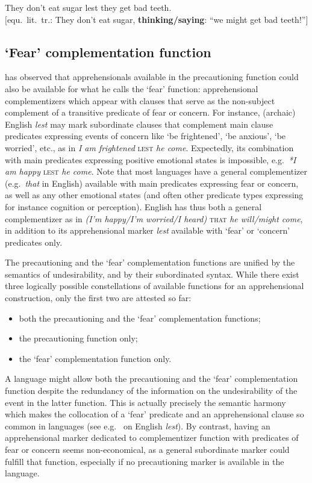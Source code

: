 \documentclass[output=paper,colorlinks,citecolor=brown]{langscibook}
\begin{document}
\ea \label{p57} They don't eat sugar lest they get bad teeth. \\
\textnormal{$[$equ.\ lit.\ tr.: They don't eat sugar, \textbf{thinking/saying}: ``we might get bad teeth!''$]$}
\z


\subsection{`Fear' complementation function}
\label{subsec:prefear}

\citet{lichtenberk1995} has observed that apprehensionals available in the precautioning function could also be available for what he calls the `fear' function: apprehensional complementizers which appear with clauses that serve as the non-subject complement of a transitive predicate of fear or concern. For instance, (archaic) English \textit{lest} may mark subordinate clauses that complement main clause predicates expressing events of concern like `be frightened', `be anxious', `be worried', etc., as in \textit{I am frightened} \textsc{lest} \textit{he come}. Expectedly, its combination with main predicates expressing positive emotional states is impossible, e.g.\ \textit{*I am happy} \textsc{lest} \textit{he come}. Note that most languages have a general complementizer (e.g.\ \textit{that} in English) available with main predicates expressing fear or concern, as well as any other emotional states (and often other predicate types expressing for instance cognition or perception). English has thus both a general complementizer as in \textit{(I'm happy/I'm worried/I heard)} \textsc{that} \textit{he will/might come}, in addition to its apprehensional marker \textit{lest} available with `fear' or `concern' predicates only.

The precautioning and the `fear' complementation functions are unified by the semantics of undesirability, and by their subordinated syntax. While there exist three logically possible constellations of available functions for an apprehensional construction, only the first two are attested so far:

\begin{itemize}
    \item both the precautioning and the `fear' complementation functions;
    \item the precautioning function only;
    \item the `fear' complementation function only.
\end{itemize}

\noindent A language might allow both the precautioning and the `fear' complementation function despite the redundancy of the information on the undesirability of the event in the latter function. This is actually precisely the semantic harmony which makes the collocation of a `fear' predicate and an apprehensional clause so common in languages (see e.g.\ \cite{López-Couso2007} on English \textit{lest}). By contrast, having an apprehensional marker dedicated to complementizer function with predicates of fear or concern seems non-economical, as a general subordinate marker could fulfill that function, especially if no precautioning marker is available in the language.
\end{document}

